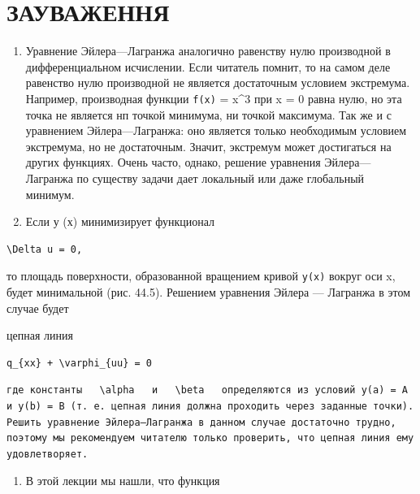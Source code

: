 \documentclass[
  ukrainian,
]{article}
\providecommand{\tightlist}{%
  \setlength{\itemsep}{0pt}\setlength{\parskip}{0pt}}
\begin{document}
\section{ЗАУВАЖЕННЯ}\label{ux437ux430ux443ux432ux430ux436ux435ux43dux43dux44f-4}

\begin{enumerate}
\def\labelenumi{\arabic{enumi}.}
\item
  Уравнение Эйлера---Лагранжа аналогично равенству нулю производной в
  дифференциальном исчислении. Если читатель помнит, то на самом деле
  равенство нулю производной не является достаточным условием
  экстремума. Например, производная функции \texttt{f(x)} = x\^{}3 при x
  = 0 равна нулю, но эта точка не является нп точкой минимума, ни точкой
  максимума. Так же и с уравнением Эйлера---Лагранжа: оно является
  только необходимым условием экстремума, но не достаточным. Значит,
  экстремум может достигаться на других функциях. Очень часто, однако,
  решение уравнения Эйлера---Лагранжа по существу задачи дает локальный
  или даже глобальный минимум.
\item
  Если у (х) минимизирует функционал
\end{enumerate}

\begin{verbatim}
\Delta u = 0,
\end{verbatim}

то площадь поверхности, образованной вращением кривой \texttt{y(x)}
вокруг оси x, будет минимальной (рис. 44.5). Решением уравнения Эйлера
--- Лагранжа в этом случае будет

цепная линия

\begin{verbatim}
q_{xx} + \varphi_{uu} = 0
\end{verbatim}

\begin{verbatim}
где константы   \alpha   и   \beta   определяются из условий y(a) = A и y(b) = B (т. е. цепная линия должна проходить через заданные точки). Решить уравнение Эйлера—Лагранжа в данном случае достаточно трудно, поэтому мы рекомендуем читателю только проверить, что цепная линия ему удовлетворяет.
\end{verbatim}

\begin{enumerate}
\def\labelenumi{\arabic{enumi}.}
\setcounter{enumi}{2}
\tightlist
\item
  В этой лекции мы нашли, что функция
\end{enumerate}
\end{document}
